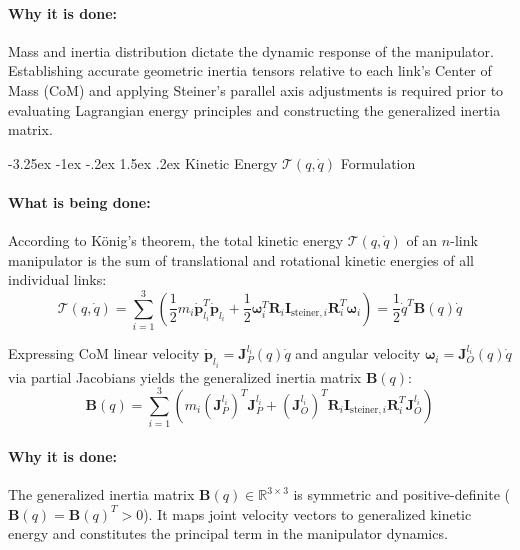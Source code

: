 \documentclass[11pt, a4paper]{article}
\makeatletter
\renewcommand{\subsection}{\@startsection{subsection}{2}{\z@}%
    {-3.25ex \@plus -1ex \@minus -.2ex}%
    {1.5ex \@plus .2ex}%
    {\normalfont\large\bfseries\color{brandaccent}}}
\makeatother
\begin{document}
\paragraph{Why it is done:}
Mass and inertia distribution dictate the dynamic response of the manipulator. Establishing accurate geometric inertia tensors relative to each link's Center of Mass (CoM) and applying Steiner's parallel axis adjustments is required prior to evaluating Lagrangian energy principles and constructing the generalized inertia matrix.

\subsection{Kinetic Energy \texorpdfstring{$\mathcal{T}(q, \dot{q})$}{T(q, dq)} Formulation}
\paragraph{What is being done:}
According to König's theorem, the total kinetic energy $\mathcal{T}(q, \dot{q})$ of an $n$-link manipulator is the sum of translational and rotational kinetic energies of all individual links:
\begin{equation}
    \mathcal{T}(q, \dot{q}) = \sum_{i=1}^{3} \left( \frac{1}{2} m_i \dot{\mathbf{p}}_{l_i}^T \dot{\mathbf{p}}_{l_i} + \frac{1}{2} \boldsymbol{\omega}_i^T \mathbf{R}_i \mathbf{I}_{\text{steiner}, i} \mathbf{R}_i^T \boldsymbol{\omega}_i \right) = \frac{1}{2} \dot{q}^T \mathbf{B}(q) \dot{q}
\end{equation}

Expressing CoM linear velocity $\dot{\mathbf{p}}_{l_i} = \mathbf{J}_{P}^{l_i}(q) \dot{q}$ and angular velocity $\boldsymbol{\omega}_i = \mathbf{J}_{O}^{l_i}(q) \dot{q}$ via partial Jacobians yields the generalized inertia matrix $\mathbf{B}(q)$:
\begin{equation}
    \mathbf{B}(q) = \sum_{i=1}^{3} \left( m_i (\mathbf{J}_{P}^{l_i})^T \mathbf{J}_{P}^{l_i} + (\mathbf{J}_{O}^{l_i})^T \mathbf{R}_i \mathbf{I}_{\text{steiner}, i} \mathbf{R}_i^T \mathbf{J}_{O}^{l_i} \right)
\end{equation}

\paragraph{Why it is done:}
The generalized inertia matrix $\mathbf{B}(q) \in \mathbb{R}^{3 \times 3}$ is symmetric and positive-definite ($\mathbf{B}(q) = \mathbf{B}(q)^T > 0$). It maps joint velocity vectors to generalized kinetic energy and constitutes the principal term in the manipulator dynamics.
\end{document}
